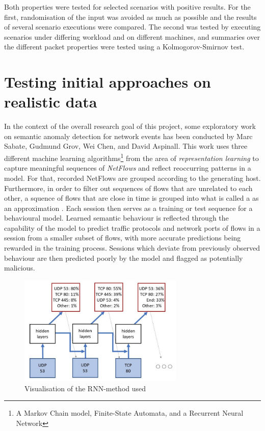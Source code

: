 \documentclass[a4paper,12pt,twoside]{report}
\begin{document}
Both properties were tested for selected scenarios with positive results. For the first, randomisation of the input was avoided as much as possible and the results of several scenario executions were compared. The second was tested by executing scenarios under differing workload and on different machines, and summaries over the different packet properties were tested using a Kolmogorov-Smirnov test. 




\section{Testing initial approaches on realistic data}\label{Prevwork}

In the context of the overall research goal of this project, some exploratory work on semantic anomaly detection for network events has been conducted by Marc Sabate, Gudmund Grov, Wei Chen, and David Aspinall. This work uses three different machine learning algorithms\footnote{A Markov Chain model, Finite-State Automata, and a Recurrent Neural Network} from the area of \textit{representation learning} to capture meaningful sequences of \textit{NetFlows} and reflect reoccurring patterns in a model. For that, recorded NetFlows are grouped according to the generating host. Furthermore, in order to filter out sequences of flows that are unrelated to each other, a squence of flows that are close in time is grouped into what is called a  as an approximation . Each session then serves as a training or test sequence for a behavioural model. Learned semantic behaviour is reflected through the capability of the model to predict traffic protocols and network ports of flows in a session from a smaller subset of flows, with more accurate predictions being rewarded in the training process. Sessions which deviate from previously observed behaviour are then predicted poorly by the model and flagged as potentially malicious.

\begin{figure}
\centering
\includegraphics[width=0.7\textwidth]{images/RNN.jpg}
\caption{Visualisation of the RNN-method used}\label{RNN}
\end{figure}
\end{document}

